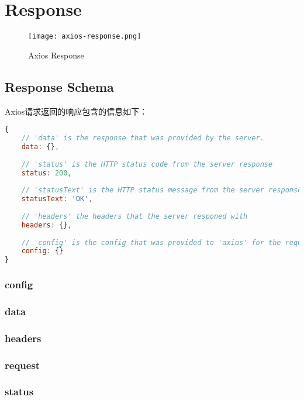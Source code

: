 \chapter{Response}

\begin{figure}[htbp]
\centering
\texttt{[image: axios-response.png]}
\caption{Axios Response}
\end{figure}

\section{Response Schema}


Axios请求返回的响应包含的信息如下：



\begin{lstlisting}[language=JavaScript]
{
    // 'data' is the response that was provided by the server.
    data: {},
    
    // 'status' is the HTTP status code from the server response
    status: 200,
    
    // 'statusText' is the HTTP status message from the server response
    statusText: 'OK',
    
    // 'headers' the headers that the server responed with
    headers: {},
    
    // 'config' is the config that was provided to 'axios' for the request
    config: {}
}
\end{lstlisting}


\subsection{config}

\subsection{data}

\subsection{headers}

\subsection{request}


\subsection{status}


